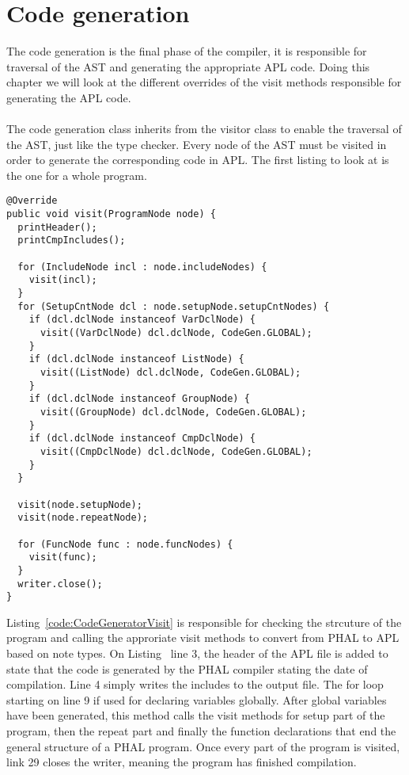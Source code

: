 \chapter{Code generation}
The code generation is the final phase of the compiler, it is responsible for traversal of the AST and generating the appropriate APL code. 
Doing this chapter we will look at the different overrides of the visit methods responsible for generating the APL code.
\\\\
The code generation class inherits from the visitor class to enable the traversal of the AST, just like the type checker. Every node of the AST must be visited in order to generate the corresponding code in APL. The first listing to look at is the one for a whole program.

\begin{lstlisting}[caption={Code generator for a program}, label={code:CodeGeneratorVisit}]
@Override
public void visit(ProgramNode node) {
  printHeader();
  printCmpIncludes();

  for (IncludeNode incl : node.includeNodes) {
    visit(incl);
  }
  for (SetupCntNode dcl : node.setupNode.setupCntNodes) {
    if (dcl.dclNode instanceof VarDclNode) {
      visit((VarDclNode) dcl.dclNode, CodeGen.GLOBAL);
    }
    if (dcl.dclNode instanceof ListNode) {
      visit((ListNode) dcl.dclNode, CodeGen.GLOBAL);
    }
    if (dcl.dclNode instanceof GroupNode) {
      visit((GroupNode) dcl.dclNode, CodeGen.GLOBAL);
    }
    if (dcl.dclNode instanceof CmpDclNode) {
      visit((CmpDclNode) dcl.dclNode, CodeGen.GLOBAL);
    }
  }

  visit(node.setupNode);
  visit(node.repeatNode);

  for (FuncNode func : node.funcNodes) {
    visit(func);
  }
  writer.close();
}
\end{lstlisting}
Listing~\ref{code:CodeGeneratorVisit} is responsible for checking the strcuture of the program and calling the approriate visit methods to convert from PHAL to APL based on note types.
On Listing~ line 3, the header of the APL file is added to state that the code is generated by the PHAL compiler stating the date of compilation. 
Line 4 simply writes the includes to the output file. The for loop starting on line 9 if used for declaring variables globally. After global variables have been generated, this method calls the visit methods for setup part of the program, then the repeat part and finally the function declarations that end the general structure of a PHAL program. Once every part of the program is visited, link 29 closes the writer, meaning the program has finished compilation.

